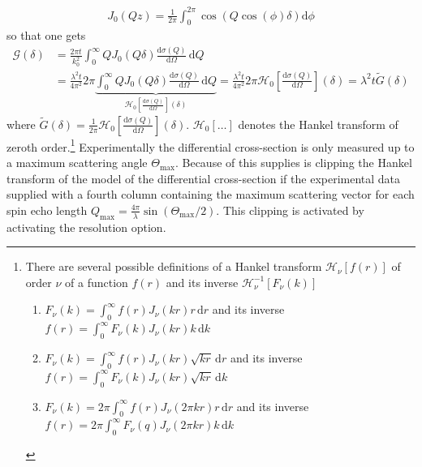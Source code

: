 \begin{align}
J_0(Qz)=\frac{1}{2\pi}\int_{0}^{2\pi} \cos\left(Q\cos(\phi)\delta\right) \mathrm{d}\phi
\end{align}
so that one gets
\begin{align}
\mathcal{G}(\delta) &= \frac{2\pi t}{k_0^2} \int_{0}^{\infty} Q J_0(Q\delta) \frac{\mathrm{d}\sigma(Q)}{\mathrm{d}\Omega} \, \mathrm{d}Q \\
&= \frac{\lambda^2 t}{4\pi^2} 2\pi\underbrace{\int_{0}^{\infty} Q J_0(Q\delta) \frac{\mathrm{d}\sigma(Q)}{\mathrm{d}\Omega} \, \mathrm{d}Q}_{\mathcal{H}_0\left[\frac{\mathrm{d}\sigma(Q)}{\mathrm{d}\Omega}\right](\delta)} = \frac{\lambda^2 t}{4\pi^2}  2\pi \mathcal{H}_0\left[\frac{\mathrm{d}\sigma(Q)}{\mathrm{d}\Omega}\right](\delta)
= \lambda^2 t \tilde{G}(\delta)
\end{align}
where $\tilde{G}(\delta)=\frac{1}{2\pi}\mathcal{H}_0\left[\frac{\mathrm{d}\sigma(Q)}{\mathrm{d}\Omega}\right](\delta)$. $\mathcal{H}_0\left[\ldots\right]$ denotes the Hankel transform of zeroth order.\footnote{\label{footnote:Hankel}
There are several possible definitions of a Hankel transform $\mathcal{H}_\nu\left[f(r)\right]$ of order $\nu$ of a function $f(r)$ and its inverse $\mathcal{H}_\nu^{-1}\left[F_\nu(k)\right]$
\begin{enumerate}
\item $F_\nu(k) = \int_0^\infty f(r) J_\nu(kr) r \,\mathrm{d}r$ and its inverse $f(r)=\int_0^\infty F_\nu(k)J_\nu(kr) k \,\mathrm{d}k$
\item $F_\nu(k) = \int_0^\infty f(r) J_\nu(kr) \sqrt{kr} \,\mathrm{d}r$ and its inverse $f(r)=\int_0^\infty F_\nu(k)J_\nu(kr)  \sqrt{kr}  \, \mathrm{d}k$
\item $F_\nu(k) = 2\pi \int_0^\infty f(r) J_\nu(2\pi kr) r \,\mathrm{d}r$ and its inverse $f(r)=2\pi \int_0^\infty F_\nu(q)J_\nu(2\pi kr) k \,\mathrm{d}k$
\end{enumerate}
}
Experimentally the differential cross-section is only measured up to a maximum scattering angle $\Theta_\mathrm{max}$. Because of this \SASfit supplies is clipping the Hankel transform of the model of the differential cross-section if the experimental data supplied with a fourth column containing the maximum scattering vector for each spin echo length $Q_\mathrm{max}=\frac{4\pi}{\lambda}\sin (\Theta_\mathrm{max}/2)$. This clipping is activated by activating the resolution option.

